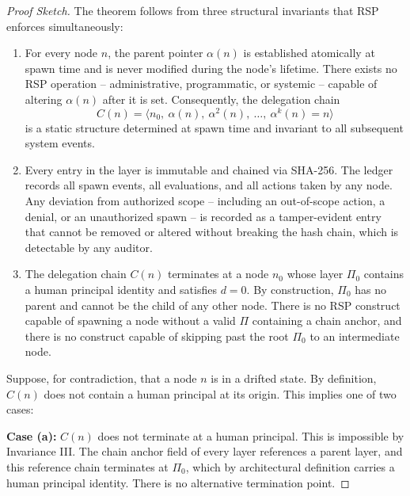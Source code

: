 \begin{proof}[Proof Sketch]
The theorem follows from three structural invariants that RSP enforces simultaneously:

\begin{enumerate}
    \item[$\textbf{Invariance I -- Immutable parent pointer:}$] For every node $n$, the parent pointer $\alpha(n)$ is established atomically at spawn time and is never modified during the node's lifetime. There exists no RSP operation -- administrative, programmatic, or systemic -- capable of altering $\alpha(n)$ after it is set. Consequently, the delegation chain
    \[
    C(n) = \langle n_0,\ \alpha(n),\ \alpha^2(n),\ \ldots,\ \alpha^k(n) = n \rangle
    \]
    is a static structure determined at spawn time and invariant to all subsequent system events.

    \item[$\textbf{Invariance II -- Forensic ledger completeness:}$] Every entry in the \fact layer is immutable and chained via SHA-256. The ledger records all spawn events, all \bounds evaluations, and all actions taken by any node. Any deviation from authorized scope -- including an out-of-scope action, a \bounds denial, or an unauthorized spawn -- is recorded as a tamper-evident entry that cannot be removed or altered without breaking the hash chain, which is detectable by any auditor.

    \item[$\textbf{Invariance III -- Chain terminates at the Purpose Layer:}$] The delegation chain $C(n)$ terminates at a node $n_0$ whose \purpose layer $\Pi_0$ contains a human principal identity and satisfies $d = 0$. By construction, $\Pi_0$ has no parent and cannot be the child of any other node. There is no RSP construct capable of spawning a node without a valid $\Pi$ containing a chain anchor, and there is no construct capable of skipping past the root $\Pi_0$ to an intermediate node.
\end{enumerate}

Suppose, for contradiction, that a node $n$ is in a drifted state. By definition, $C(n)$ does not contain a human principal at its origin. This implies one of two cases:

\textbf{Case (a):} $C(n)$ does not terminate at a human principal. This is impossible by Invariance III. The chain anchor field of every \purpose layer references a parent \purpose layer, and this reference chain terminates at $\Pi_0$, which by architectural definition carries a human principal identity. There is no alternative termination point.


\end{proof}
